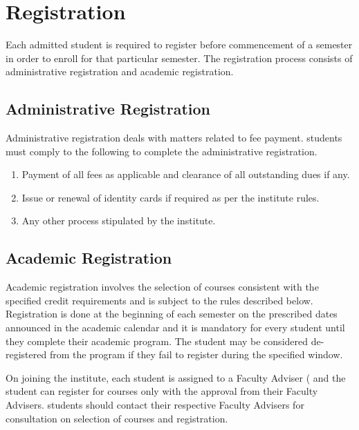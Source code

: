 \section{Registration \label{lab:Registration} }

Each admitted \gls{student} is required to register before commencement of a semester in order to enroll for that particular semester. The registration process consists of administrative registration and academic registration.

\subsection{Administrative Registration}

Administrative registration deals with matters related to fee payment. \Glspl{student} must comply to the following to complete the administrative registration.

\begin{enumerate}[leftmargin=15mm]
    \item Payment of all fees as applicable and clearance of all outstanding dues if any.
    \item Issue or renewal of identity cards if required as per the \gls{institute} rules.
    \item Any other process stipulated by the \gls{institute}.
\end{enumerate}

\subsection{Academic Registration}

Academic registration involves the selection of courses consistent with the specified credit requirements and is subject to the rules described below. Registration is done at the beginning of each semester on the prescribed dates announced in the academic calendar and it is mandatory for every student until they complete their academic program. The \gls{student} may be considered de-registered from the program if they fail to register during the specified window.

On joining the \gls{institute}, each \gls{student} is assigned to a Faculty Adviser ( and the student can register for courses only with the approval from their Faculty Advisers. \Glspl{student} should contact their respective Faculty Advisers for consultation on selection of courses and registration.

